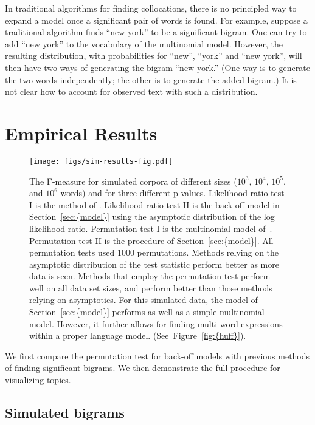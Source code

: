 \documentclass[11pt]{article}
\begin{document}
In traditional algorithms for finding collocations, there is no
principled way to expand a model once a significant pair of words is
found.  For example, suppose a traditional algorithm finds ``new
york'' to be a significant bigram.  One can try to add ``new york'' to
the vocabulary of the multinomial model.  However, the resulting
distribution, with probabilities for ``new'', ``york'' and ``new
york'', will then have two ways of generating the bigram ``new york.''
(One way is to generate the two words independently; the other is to
generate the added bigram.)  It is not clear how to account for
observed text with such a distribution.

\section{Empirical Results}

\begin{figure*}[t]
   \texttt{[image: figs/sim-results-fig.pdf]}
   \caption{\label{fig:f-measure} The F-measure for simulated corpora
     of different sizes ($10^3$, $10^4$, $10^5$, and $10^6$ words) and
     for three different p-values.  Likelihood ratio test I is the
     method of \cite{Dunning:1993}.  Likelihood ratio test II is the
     back-off model in {Section~\ref{sec:{model}}} using the asymptotic distribution
     of the log likelihood ratio.  Permutation test I is the
     multinomial model of~\cite{Pedersen:1996}.  Permutation test II
     is the procedure of {Section~\ref{sec:{model}}}.  All permutation tests used
     $1000$ permutations.  Methods relying on the asymptotic
     distribution of the test statistic perform better as more data is
     seen.  Methods that employ the permutation test perform well on
     all data set sizes, and perform better than those methods relying
     on asymptotics.  For this simulated data, the model of
     {Section~\ref{sec:{model}}} performs as well as a simple multinomial
     model. However, it further allows for finding multi-word
     expressions within a proper language model.  (See~{Figure~\ref{fig:{huff}}}).}
\end{figure*}

\label{sec:results}

We first compare the permutation test for back-off models with
previous methods of finding significant bigrams.  We then demonstrate
the full procedure for visualizing topics.

\subsection{Simulated bigrams}
\end{document}
